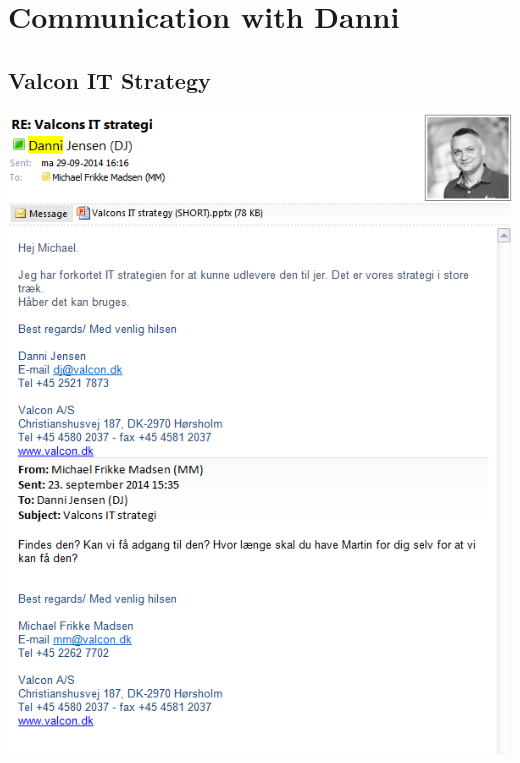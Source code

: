 \begin{linenumbers*}
\label{app:emails}
\section{Communication with Danni}

\subsection{Valcon IT Strategy}
\includegraphics[width=1.36\textwidth]{appendix/danni_communication_1}


\end{linenumbers*}
